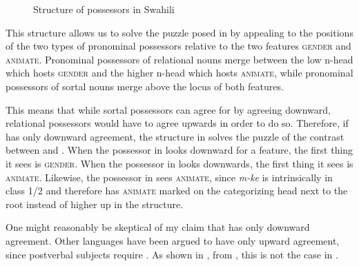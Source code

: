 \documentclass[output=paper,newtxmath,modfonts,nonflat,hidelinks]{langsci/langscibook}
\begin{document}
\begin{figure}[htbp]
\begin{center}


\caption{Structure of possessors in Swahili}
\label{ex:pesetsky:syntacticconfig}
\end{center}
\end{figure}

This structure allows us to solve the puzzle posed in  by appealing to the positions of the two types of pronominal possessors relative to the two features \textsc{gender} and \textsc{animate}. Pronominal possessors of relational nouns merge between the low n-head which hosts \textsc{gender} and the higher n-head which hosts \textsc{animate}, while pronominal possessors of sortal nouns merge above the locus of both features. 

This means that while sortal possessors can agree for  by agreeing downward, relational possessors would have to agree upwards in order to do so.  Therefore, if  has only downward agreement, the structure in  solves the puzzle of the contrast between  and . When the possessor in  looks downward for a  feature, the first thing it sees is \textsc{gender}.  When the possessor in  looks downwards, the first thing it sees is \textsc{animate}.  Likewise, the possessor in  sees \textsc{animate}, since \textit{m-ke} is intrinsically in class 1/2 and therefore has \textsc{animate} marked on the categorizing head next to the root instead of higher up in the structure. 

One might reasonably be skeptical of my claim that  has only downward agreement.  Other  languages have been argued to have only upward agreement, since postverbal subjects require . As shown in , from \citet{taniguchi13}, this is not the case in .
\end{document}
